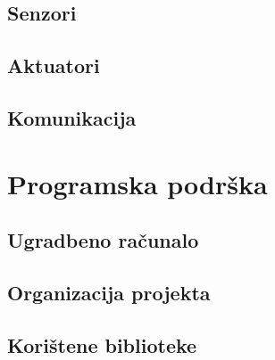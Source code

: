 \documentclass[times, utf8, diplomski, numeric]{templates/template}
\begin{document}
{{        \subsection{Senzori}{
        }

        \subsection{Aktuatori}{
        }

        \subsection{Komunikacija}{
        }
    }
    
    \section{Programska podrška}{
        \subsection{Ugradbeno računalo}{
        }

        \subsection{Organizacija projekta}{
        }
        
        \subsection{Korištene biblioteke}{
        }

}}
\end{document}
